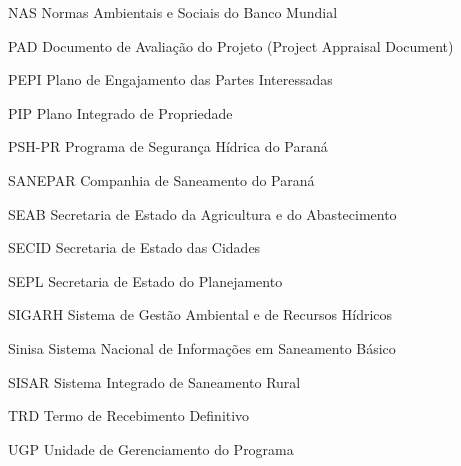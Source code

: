 \documentclass[12pt, oneside, a4paper, english, brazil]{abntex2}
\newif\ifmostrarpendencias
\begin{document}
\begin{siglas}
  \item[NAS] Normas Ambientais e Sociais do Banco Mundial
  \item[PAD] Documento de Avaliação do Projeto (Project Appraisal Document)
  \item[PEPI] Plano de Engajamento das Partes Interessadas
  \item[PIP] Plano Integrado de Propriedade
  \item[PSH-PR] Programa de Segurança Hídrica do Paraná
  \item[SANEPAR] Companhia de Saneamento do Paraná
  \item[SEAB] Secretaria de Estado da Agricultura e do Abastecimento
  \item[SECID] Secretaria de Estado das Cidades
  \item[SEPL] Secretaria de Estado do Planejamento
  \item[SIGARH] Sistema de Gestão Ambiental e de Recursos Hídricos
  \item[Sinisa] Sistema Nacional de Informações em Saneamento Básico
  \item[SISAR] Sistema Integrado de Saneamento Rural
  \item[TRD] Termo de Recebimento Definitivo
  \item[UGP] Unidade de Gerenciamento do Programa
\end{siglas}

\tableofcontents*
\cleardoublepage

\textual










\postextual



\ifmostrarpendencias
  \chapter*{Lista de pendências}
  \addcontentsline{toc}{chapter}{Lista de pendências}
  \makeatletter\@starttoc{tdo}\makeatother
\fi
\end{document}
